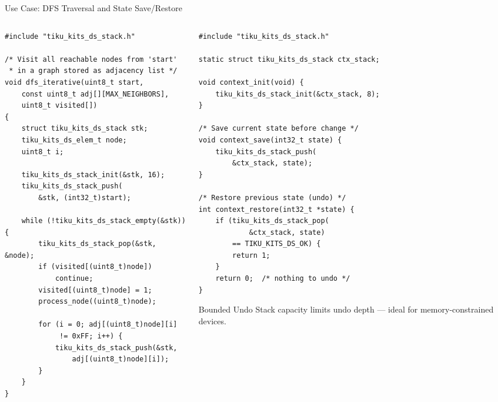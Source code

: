 \documentclass[aspectratio=169, 10pt]{beamer}
\begin{document}
\begin{frame}[fragile]{Use Case: DFS Traversal and State Save/Restore}
\begin{columns}[T]
\begin{column}{0.48\textwidth}
\begin{lstlisting}[style=cstyle,
  title={Iterative DFS using the stack}]
#include "tiku_kits_ds_stack.h"

/* Visit all reachable nodes from 'start'
 * in a graph stored as adjacency list */
void dfs_iterative(uint8_t start,
    const uint8_t adj[][MAX_NEIGHBORS],
    uint8_t visited[])
{
    struct tiku_kits_ds_stack stk;
    tiku_kits_ds_elem_t node;
    uint8_t i;

    tiku_kits_ds_stack_init(&stk, 16);
    tiku_kits_ds_stack_push(
        &stk, (int32_t)start);

    while (!tiku_kits_ds_stack_empty(&stk)) {
        tiku_kits_ds_stack_pop(&stk, &node);
        if (visited[(uint8_t)node])
            continue;
        visited[(uint8_t)node] = 1;
        process_node((uint8_t)node);

        for (i = 0; adj[(uint8_t)node][i]
             != 0xFF; i++) {
            tiku_kits_ds_stack_push(&stk,
                adj[(uint8_t)node][i]);
        }
    }
}
\end{lstlisting}
\end{column}

\begin{column}{0.48\textwidth}
\begin{lstlisting}[style=cstyle,
  title={State save/restore pattern}]
#include "tiku_kits_ds_stack.h"

static struct tiku_kits_ds_stack ctx_stack;

void context_init(void) {
    tiku_kits_ds_stack_init(&ctx_stack, 8);
}

/* Save current state before change */
void context_save(int32_t state) {
    tiku_kits_ds_stack_push(
        &ctx_stack, state);
}

/* Restore previous state (undo) */
int context_restore(int32_t *state) {
    if (tiku_kits_ds_stack_pop(
            &ctx_stack, state)
        == TIKU_KITS_DS_OK) {
        return 1;
    }
    return 0;  /* nothing to undo */
}
\end{lstlisting}

\vspace{0.3em}
\begin{block}{Bounded Undo}
Stack capacity limits undo depth ---
ideal for memory-constrained devices.
\end{block}
\end{column}
\end{columns}
\end{frame}
\end{document}
